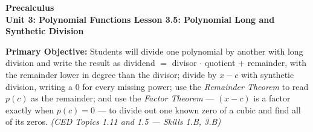 \documentclass[10pt]{article}
\newcommand{\CourseName}{Precalculus}
\newcommand{\UnitNumberName}{Unit 3: Polynomial Functions \quad}
\newcommand{\LessonNumberName}{Lesson 3.5: Polynomial Long and Synthetic Division}
\begin{document}
\begin{center}
    {\Large\bfseries \CourseName \\
    {\small\bfseries \UnitNumberName \LessonNumberName}}
\end{center}

\begin{tcolorbox}[colback=lilac, colframe=plum, boxrule=0.9pt, arc=2mm,
    left=2mm, right=2mm, top=1.5mm, bottom=1.5mm]
    \textbf{Primary Objective:} Students will divide one polynomial by another with long
    division and write the result as dividend $=$ divisor $\cdot$ quotient $+$ remainder, with
    the remainder lower in degree than the divisor; divide by $x - c$ with synthetic division,
    writing a $0$ for every missing power; use the \textit{Remainder Theorem} to read $p(c)$ as
    the remainder; and use the \textit{Factor Theorem} --- $(x - c)$ is a factor exactly when
    $p(c) = 0$ --- to divide out one known zero of a cubic and find all of its zeros.
    \hfill\textit{\small (CED Topics 1.11 and 1.5 --- Skills 1.B, 3.B)}
\end{tcolorbox}
\end{document}
